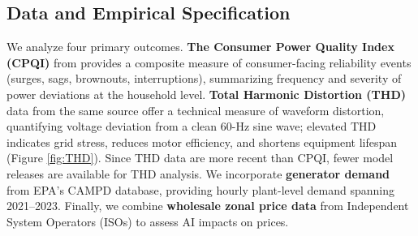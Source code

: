 \documentclass[sigconf,authordraft]{acmart}
\begin{document}

\subsection{Data and Empirical Specification}
We analyze four primary outcomes. \textbf{The Consumer Power Quality Index (CPQI)} from \cite{WhiskerLabs_THD_2024} provides a composite measure of consumer-facing reliability events (surges, sags, brownouts, interruptions), summarizing frequency and severity of power deviations at the household level. \textbf{Total Harmonic Distortion (THD)} data from the same source offer a technical measure of waveform distortion, quantifying voltage deviation from a clean 60-Hz sine wave; elevated THD indicates grid stress, reduces motor efficiency, and shortens equipment lifespan (Figure \ref{fig:THD}). Since THD data are more recent than CPQI, fewer model releases are available for THD analysis. We incorporate \textbf{generator demand} from EPA's CAMPD database, providing hourly plant-level demand spanning 2021–2023. Finally, we combine \textbf{wholesale zonal price data} from Independent System Operators (ISOs) to assess AI impacts on prices.
\end{document}
